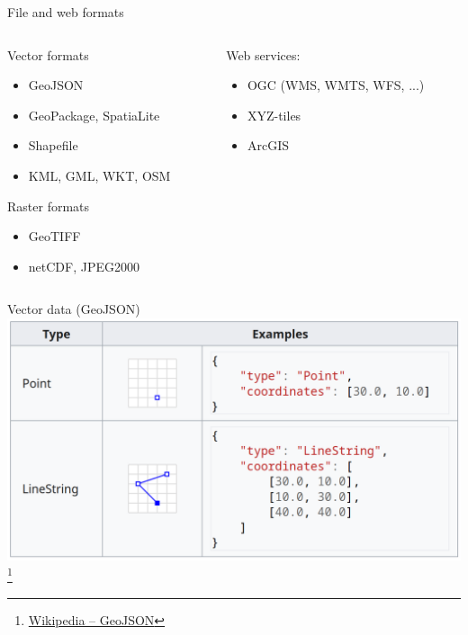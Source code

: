 \documentclass{beamer}
\begin{document}
		\begin{frame}{File and web formats}
			\begin{columns}[t]
				\begin{column}{0.47\textwidth}
					Vector formats
					\begin{itemize}
						\item GeoJSON
						\item GeoPackage, SpatiaLite
						\item Shapefile
						\item KML, GML, WKT, OSM
					\end{itemize}
					\pause
					Raster formats
					\begin{itemize}
						\item GeoTIFF
						\item netCDF, JPEG2000
					\end{itemize}
					\pause
				\end{column}
				\begin{column}{0.53\textwidth}
					Web services:
					\begin{itemize}
						\item OGC (WMS, WMTS, WFS, ...)
						\item XYZ-tiles
						\item ArcGIS
					\end{itemize}
				\end{column}
			\end{columns}
		\end{frame}
		
		\begin{frame}{Vector data (GeoJSON)}
			\includegraphics[width=\textwidth]{images/geodata-vector-1.png}\footnote{\href{https://en.wikipedia.org/wiki/GeoJSON}{Wikipedia -- GeoJSON}}
		\end{frame}
		
\end{document}
